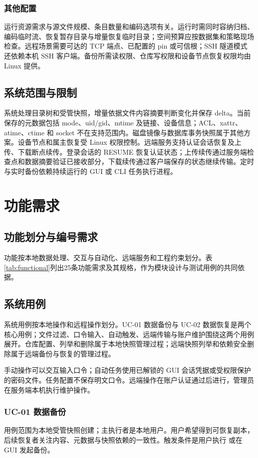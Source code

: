 \subsubsection{其他配置}
运行资源需求与源文件规模、条目数量和编码选项有关。运行时需同时容纳归档、编码临时流、恢复暂存目录与增量恢复临时目录；空间预算应按数据集和策略现场检查。远程场景需要可达的 TCP 端点、已配置的 pin 或可信根；SSH 隧道模式还依赖本机 SSH 客户端。备份所需读权限、仓库写权限和设备节点恢复权限均由 Linux 提供。

\subsection{系统范围与限制}
系统处理目录树和受管快照，增量依据文件内容摘要判断变化并保存 delta。当前保存的元数据包括 mode、uid/gid、mtime 及链接、设备信息；ACL、xattr、atime、ctime 和 socket 不在支持范围内。磁盘镜像与数据库事务快照属于其他方案。设备节点和属主恢复受 Linux 权限控制。远端服务支持认证会话恢复及上传、下载断点续传。登录会话的 RESUME 恢复认证状态；上传续传通过服务端检查点和数据摘要验证已接收部分，下载续传通过客户端保存的状态继续传输。定时与实时备份依赖持续运行的 GUI 或 CLI 任务执行进程。

\section{功能需求}
\subsection{功能划分与编号需求}
功能按本地数据处理、交互与自动化、远端服务和工程约束划分。表\ref{tab:functional}列出25条功能需求及其规格，作为模块设计与测试用例的共同依据。


\subsection{系统用例}
系统用例按本地操作和远程操作划分。UC-01 数据备份与 UC-02 数据恢复是两个核心用例；文件过滤、口令输入、自动触发、远端传输与账户维护围绕这两个用例展开。仓库配置、列举和删除属于本地快照管理过程；远端快照列举和依赖安全删除属于远端备份与恢复的管理过程。


手动操作可以交互输入口令；自动任务使用已解锁的 GUI 会话凭据或受权限保护的密码文件。任务配置不保存明文口令。远端操作在账户认证通过后进行，管理员在服务端本机执行维护操作。

\subsubsection{UC-01 数据备份}
用例范围为本地受管快照创建；主执行者是本地用户。用户希望得到可恢复副本，后续恢复者关注内容、元数据与快照依赖的一致性。触发条件是用户执行  或在 GUI 发起备份。

